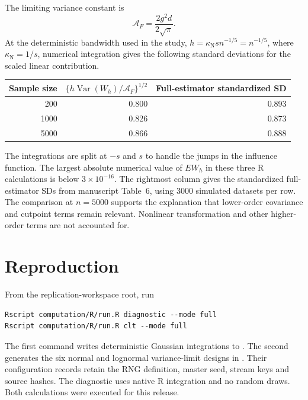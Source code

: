 \documentclass[11pt]{article}
\begin{document}
The limiting variance constant is
\[
 \mathcal A_F=\frac{2g^2d}{2\sqrt\pi}.
\]
At the deterministic bandwidth used in the study,
$h=\kappa_{\mathrm N}s n^{-1/5}=n^{-1/5}$, where $\kappa_{\mathrm N}=1/s$, numerical integration gives
the following standard deviations for the scaled linear contribution.
\begin{center}
\begin{tabular}{rrr}
\toprule
Sample size & $\{h\operatorname{Var}(W_h)/\mathcal A_F\}^{1/2}$
            & Full-estimator standardized SD \\
\midrule
200 & 0.800 & 0.893 \\
1000 & 0.826 & 0.873 \\
5000 & 0.866 & 0.888 \\
\bottomrule
\end{tabular}
\end{center}
The integrations are split at $-s$ and $s$ to handle the jumps in the
influence function. The largest absolute numerical value of $E W_h$ in
these three R calculations is below $3\times10^{-16}$. The rightmost
column gives the standardized full-estimator SDs from manuscript Table~6,
using 3000 simulated datasets per row. The comparison at
$n=5000$ supports the explanation that lower-order covariance and
cutpoint terms remain relevant. Nonlinear transformation and other
higher-order terms are not accounted for.

\section*{Reproduction}
From the replication-workspace root, run
\begin{verbatim}
Rscript computation/R/run.R diagnostic --mode full
Rscript computation/R/run.R clt --mode full
\end{verbatim}
The first command writes deterministic Gaussian integrations to
. The second generates
the six normal and lognormal variance-limit designs in
. Their configuration records
retain the RNG definition, master seed, stream keys and source hashes.
The diagnostic uses native R integration and no random draws. Both calculations were executed for this release.
\end{document}
